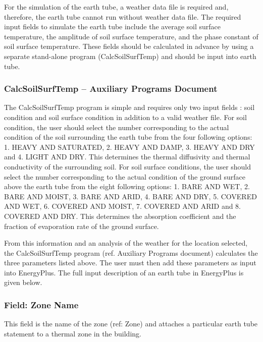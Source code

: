 For the simulation of the earth tube, a weather data file is required and, therefore, the earth tube cannot run without weather data file. The required input fields to simulate the earth tube include the average soil surface temperature, the amplitude of soil surface temperature, and the phase constant of soil surface temperature. These fields should be calculated in advance by using a separate stand-alone program (CalcSoilSurfTemp) and should be input into earth tube.

\subsubsection{CalcSoilSurfTemp -- Auxiliary Programs Document}\label{calcsoilsurftemp-auxiliary-programs-document}

The CalcSoilSurfTemp program is simple and requires only two input fields : soil condition and soil surface condition in addition to a valid weather file. For soil condition, the user should select the number corresponding to the actual condition of the soil surrounding the earth tube from the four following options: 1. HEAVY AND SATURATED, 2. HEAVY AND DAMP, 3. HEAVY AND DRY and 4. LIGHT AND DRY. This determines the thermal diffusivity and thermal conductivity of the surrounding soil. For soil surface conditions, the user should select the number corresponding to the actual condition of the ground surface above the earth tube from the eight following options: 1. BARE AND WET, 2. BARE AND MOIST, 3. BARE AND ARID, 4. BARE AND DRY, 5. COVERED AND WET, 6. COVERED AND MOIST, 7. COVERED AND ARID and 8. COVERED AND DRY. This determines the absorption coefficient and the fraction of evaporation rate of the ground surface.

From this information and an analysis of the weather for the location selected, the CalcSoilSurfTemp program (ref. Auxiliary Programs document) calculates the three parameters listed above. The user must then add these parameters as input into EnergyPlus. The full input description of an earth tube in EnergyPlus is given below.

\subsubsection{Field: Zone Name}\label{field-zone-name-5}

This field is the name of the zone (ref: Zone) and attaches a particular earth tube statement to a thermal zone in the building.

